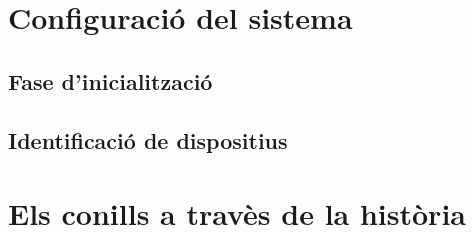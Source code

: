 \documentclass[11pt,catalan,
               listoftables,listoffigures,listofalgorithms,listofquadres]
               {tfgetsinf}
\begin{document}
\chapter{Configuració del sistema}

\lipsum[25]
\lipsum[26]
\lipsum[27]

\section{Fase d'inicialització}

\lipsum[28]

\section{Identificació de dispositius}

\lipsum[29]


\chapter{Els conills a travès de la història}

\lipsum[30]
\lipsum[31]
\lipsum[32]
\lipsum[33]
\lipsum[34]
\lipsum[35]
\lipsum[36]



\end{document}
